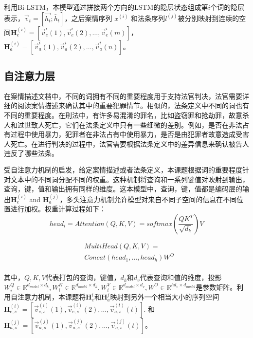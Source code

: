 利用Bi-LSTM，本模型通过拼接两个方向的LSTM的隐层状态组成第$i$个词的隐层表示，$\vec{v}_t=[\overrightarrow{h_t};\overleftarrow{h_t}]$，之后案情序列 $x^{(i)}$ 和法条序列$l^{(j)}$被分别映射到连续的空间$\textbf{H}_e^{(i)}=[\vec{v}_e^{i}(1), \vec{v}_e^{i}(2), \dots, \vec{v}_e^{i}(m)]$，
$\textbf{H}_a^{(i)}=[\vec{v}_a^{i}(1), \vec{v}_a^{i}(2), \dots, \vec{v}_a^{i}(n)]$。
\subsection{自注意力层}

在案情描述文档中，不同的词拥有不同的重要程度用于支持法官判决，法官需要详细的阅读案情描述来确认其中的重要犯罪情节。相似的，法条定义中不同的词也有不同的重要程度。在刑法中，有许多易混淆的罪名，比如盗窃罪和抢劫罪，故意杀人和过世致人死亡，它们在法条定义中只有一些细微的差别。例如，是否在非法占有过程中使用暴力，犯罪者在非法占有中使用暴力，是否是由犯罪者故意造成受害人死亡。在进行判决的过程中，法官需要根据法条定义中的差异信息来确认被告人违反了哪些法条。

受自注意力机制\cite{VaswaniSPUJGKP17}的启发，给定案情描述或者法条定义，本课题根据词的重要程度针对文本中的不同词分配不同的权重。这种机制将查询和一系列键值对映射到输出，查询，键，值和输出拥有同样的维度。这本模型中，查询，键，值都是编码层的输出$\textbf{H}_e^{(i)}$ and $\textbf{H}_a^{(j)}$，多头注意力机制允许模型对来自不同子空间的信息在不同位置进行加权。权重计算过程如下：
\begin{equation}\label{eq:self_attention}
    head_i = Attention(Q,K,V) = softmax(\frac{QK^{T}}{\sqrt{d_k}})V
\end{equation}

\begin{equation}\label{eq:multi_head_attention}
    \begin{aligned}
        &MultiHead(Q,K,V) = \\
        &Concat(head_1,\dots,head_h)W^{O} \\            
    \end{aligned}
\end{equation}

其中，$Q,K,V$代表打包的查询，键值，$d_k$和$d_v$代表查询和值的维度，投影$W_i^Q \in \mathbb{R}^{d_{model} \times d_k}, W_i^K 
\in \mathbb{R}^{d_{model} \times d_k},W_i^V \in \mathbb{R}^{d_{model} \times d_v}, W^O \in \mathbb{R}^{hd_v \times d_{model}}$是参数矩阵。利用自注意力机制，本课题将$\textbf{H}_e^i$和$\textbf{H}_a^j$映射到另外一个相当大小的序列空间 $\textbf{H}_{e,s}^{(i)} = [\vec{v}_{e,s}^{(i)}(1), \vec{v}_{e,s}^{(i)}(2), \dots, \vec{v}_{a,s}^{(t)}(t)]$. 和 $\textbf{H}_{a,s}^{(j)}=[\vec{v}_{a,s}^{(j)}(1), \vec{v}_{a,s}^{(j)}(2), \dots, \vec{v}_{a,s}^{(j)}(t)]$。
